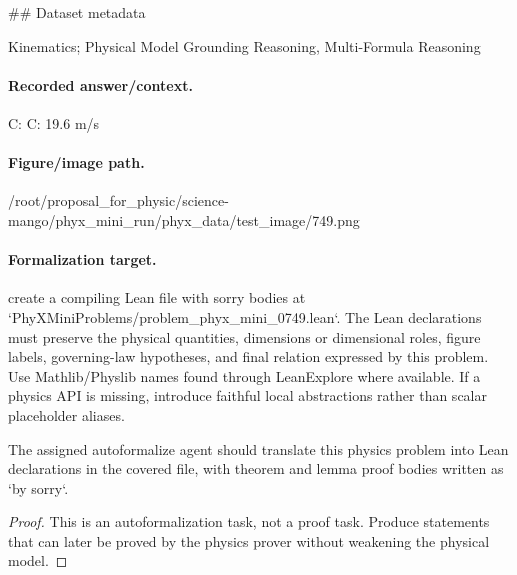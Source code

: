 \#\# Dataset metadata

Kinematics; Physical Model Grounding Reasoning, Multi-Formula Reasoning

\paragraph{Recorded answer/context.}
C: C: 19.6 m/s

\paragraph{Figure/image path.}
/root/proposal\_for\_physic/science-mango/phyx\_mini\_run/phyx\_data/test\_image/749.png

\paragraph{Formalization target.}
create a compiling Lean file with sorry bodies at `PhyXMiniProblems/problem\_phyx\_mini\_0749.lean`. The Lean declarations must preserve the physical quantities, dimensions or dimensional roles, figure labels, governing-law hypotheses, and final relation expressed by this problem.
Use Mathlib/Physlib names found through LeanExplore where available. If a physics API is missing, introduce faithful local abstractions rather than scalar placeholder aliases.

\begin{theorem}
\label{thm:physics:phyx_mini_0749:target}
The assigned autoformalize agent should translate this physics problem into Lean declarations in the covered file, with theorem and lemma proof bodies written as `by sorry`.
\end{theorem}
\begin{proof}
This is an autoformalization task, not a proof task. Produce statements that can later be proved by the physics prover without weakening the physical model.
\end{proof}

